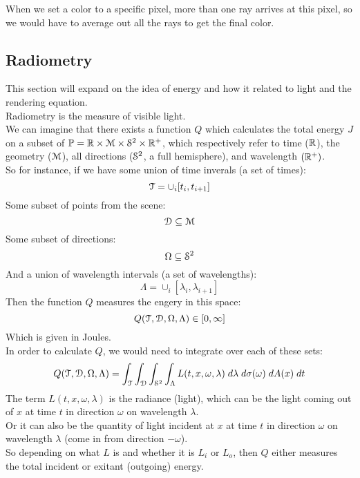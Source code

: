 \documentclass[12pt]{article}
\begin{document}
When we set a color to a specific pixel, more than
one ray arrives at this pixel, so we would have to
average out all the rays to get the final color. \\

\newpage

\subsection*{Radiometry}

This section will expand on the idea of energy
and how it related to light and the rendering
equation. \\

Radiometry is the measure of visible light. \\

We can imagine that there exists a function
$Q$ which calculates the total energy $J$
on a subset of
$\mathbb{P} = \mathbb{R} \times \mathcal{M} \times \mathcal{S}^2 \times \mathbb{R}^+$,
which respectively refer to time ($\mathbb{R}$),
the geometry ($\mathcal{M}$),
all directions ($\mathcal{S}^2$, a full hemisphere),
and wavelength $(\mathbb{R}^+)$. \\

So for instance, if we have some
union of time inverals (a set of times):
\[ \mathcal{T} = \cup_i[t_i, t_{i+1}] \]
Some subset of points from the scene:
\[ \mathcal{D} \subseteq \mathcal{M} \]
Some subset of directions:
\[ \Omega \subseteq \mathcal{S}^2 \]
And a union of wavelength intervals (a set of wavelengths):
\[ \Lambda = \cup_i[\lambda_i, \lambda_{i+1}] \]
Then the function $Q$ measures the engery
in this space: 
\[ Q(\mathcal{T}, \mathcal{D}, \Omega, \Lambda) \in [0, \infty] \] 
Which is given in Joules. \\

In order to calculate $Q$, we would need to
integrate over each of these sets:
\[ Q(\mathcal{T}, \mathcal{D}, \Omega, \Lambda)
= \int_{\mathcal{T}} \int_{\mathcal{D}} \int_{\mathcal{S}^2} \int_\Lambda
L(t, x, \omega, \lambda) 
\; d\lambda \; d\sigma(\omega) \; dA(x) \; dt \]
The term $L(t, x, \omega, \lambda)$
is the radiance (light),
which can be the light coming out of $x$ at time $t$
in direction $\omega$ on wavelength $\lambda$. \\
Or it can also be the quantity of 
light incident at $x$ at time $t$
in direction $\omega$ on wavelength 
$\lambda$ (come in from direction $-\omega$). \\
So depending on what $L$ is
and whether it is $L_i$ or $L_o$,
then $Q$ either measures
the total incident or exitant (outgoing) energy. \\
\end{document}
